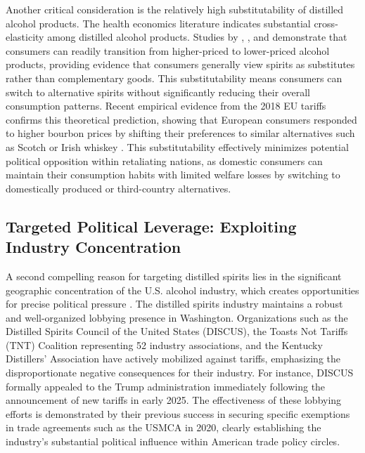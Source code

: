 \documentclass[AEJ]{AEA}
\begin{document}
	Another critical consideration is the relatively high substitutability of distilled alcohol products. The health economics literature indicates substantial cross-elasticity among distilled alcohol products. Studies by \cite{yeh_possible_2013}, \cite{anderson_effects_2022}, and \cite{manning_demand_1995} demonstrate that consumers can readily transition from higher-priced to lower-priced alcohol products, providing evidence that consumers generally view spirits as substitutes rather than complementary goods. This substitutability means consumers can switch to alternative spirits without significantly reducing their overall consumption patterns. Recent empirical evidence from the 2018 EU tariffs confirms this theoretical prediction, showing that European consumers responded to higher bourbon prices by shifting their preferences to similar alternatives such as Scotch or Irish whiskey \citep{ferguson_domestic_2024}. This substitutability effectively minimizes potential political opposition within retaliating nations, as domestic consumers can maintain their consumption habits with limited welfare losses by switching to domestically produced or third-country alternatives.
	
	\subsection{Targeted Political Leverage: Exploiting Industry Concentration}
	
	A second compelling reason for targeting distilled spirits lies in the significant geographic concentration of the U.S. alcohol industry, which creates opportunities for precise political pressure \citep{fetzer_tariffs_nodate}. The distilled spirits industry maintains a robust and well-organized lobbying presence in Washington. Organizations such as the Distilled Spirits Council of the United States (DISCUS), the Toasts Not Tariffs (TNT) Coalition representing 52 industry associations, and the Kentucky Distillers' Association have actively mobilized against tariffs, emphasizing the disproportionate negative consequences for their industry. For instance, DISCUS formally appealed to the Trump administration immediately following the announcement of new tariffs in early 2025. The effectiveness of these lobbying efforts is demonstrated by their previous success in securing specific exemptions in trade agreements such as the USMCA in 2020, clearly establishing the industry's substantial political influence within American trade policy circles.
	
\end{document}
